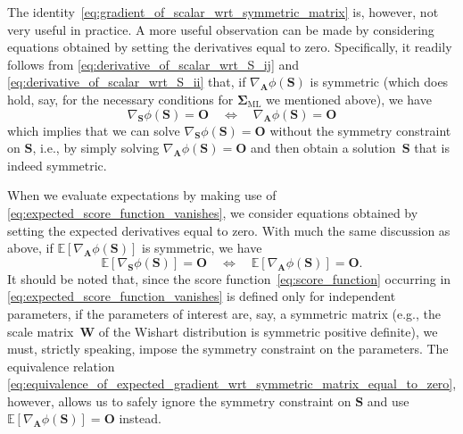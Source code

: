 \documentclass[12pt,a4paper]{article}
\begin{document}
The identity~\eqref{eq:gradient_of_scalar_wrt_symmetric_matrix} is, however, not very useful
in practice.
A more useful observation can be made by considering equations obtained by
setting the derivatives equal to zero.
Specifically, it readily follows from \eqref{eq:derivative_of_scalar_wrt_S_ij} and
\eqref{eq:derivative_of_scalar_wrt_S_ii} that,
if $\nabla_{\mathbf{A}} \phi(\mathbf{S})$ is symmetric
(which does hold, say,
for the necessary conditions for $\bm{\Sigma}_{\text{ML}}$ we mentioned above),
we have
\begin{equation}
\nabla_{\mathbf{S}} \phi(\mathbf{S}) = \mathbf{O}
\quad \Longleftrightarrow \quad
\nabla_{\mathbf{A}} \phi(\mathbf{S}) = \mathbf{O}
\end{equation}
which implies that we can solve $\nabla_{\mathbf{S}} \phi(\mathbf{S}) = \mathbf{O}$
without the symmetry constraint on $\mathbf{S}$, i.e.,
by simply solving $\nabla_{\mathbf{A}} \phi(\mathbf{S}) = \mathbf{O}$
and then obtain a solution~$\mathbf{S}$ that is indeed symmetric.

When we evaluate expectations by making use of \eqref{eq:expected_score_function_vanishes},
we consider equations obtained by setting the expected derivatives equal to zero.
With much the same discussion as above,
if $\mathbb{E}\left[\nabla_{\mathbf{A}} \phi(\mathbf{S})\right]$ is symmetric,
we have
\begin{equation}
\mathbb{E}\left[\nabla_{\mathbf{S}} \phi(\mathbf{S})\right] = \mathbf{O}
\quad \Longleftrightarrow \quad
\mathbb{E}\left[\nabla_{\mathbf{A}} \phi(\mathbf{S})\right] = \mathbf{O} .
\label{eq:equivalence_of_expected_gradient_wrt_symmetric_matrix_equal_to_zero}
\end{equation}
It should be noted that, since the score function~\eqref{eq:score_function}
occurring in \eqref{eq:expected_score_function_vanishes}
is defined only for independent parameters,
if the parameters of interest are, say, a symmetric matrix
(e.g., the scale matrix~$\mathbf{W}$ of the Wishart distribution is symmetric positive definite),
we must, strictly speaking, impose the symmetry constraint on the parameters.
The equivalence relation~%
\eqref{eq:equivalence_of_expected_gradient_wrt_symmetric_matrix_equal_to_zero}, however,
allows us to safely ignore the symmetry constraint on $\mathbf{S}$ and use
$\mathbb{E}\left[\nabla_{\mathbf{A}} \phi(\mathbf{S})\right] = \mathbf{O}$ instead.
\end{document}
